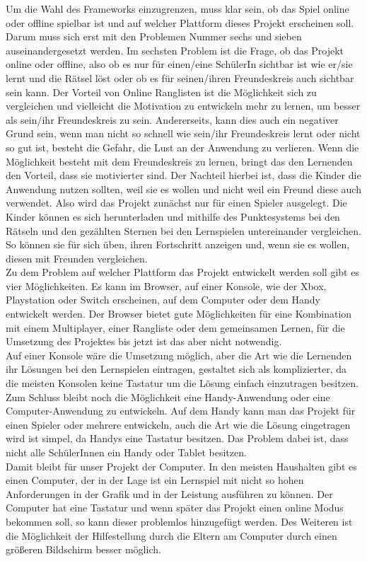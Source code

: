 Um die Wahl des Frameworks einzugrenzen, muss klar sein, ob das Spiel online oder offline spielbar ist und auf welcher Plattform dieses Projekt erscheinen soll.\\
Darum muss sich erst mit den Problemen Nummer sechs und sieben auseinandergesetzt werden.
Im sechsten Problem ist die Frage, ob das Projekt online oder offline, also ob es nur für einen/eine SchülerIn sichtbar ist wie er/sie lernt und die Rätsel löst oder ob es für seinen/ihren Freundeskreis auch sichtbar sein kann. Der Vorteil von Online Ranglisten ist die Möglichkeit sich zu vergleichen und vielleicht die Motivation zu entwickeln mehr zu lernen, um besser als sein/ihr Freundeskreis zu sein. Andererseits, kann dies auch ein negativer Grund sein, wenn man  nicht so schnell wie sein/ihr Freundeskreis lernt oder nicht so gut ist, besteht die Gefahr, die Lust an der Anwendung zu verlieren. Wenn die Möglichkeit besteht mit dem Freundeskreis zu lernen, bringt das den Lernenden den Vorteil, dass sie motivierter sind. Der Nachteil hierbei ist, dass die Kinder die Anwendung nutzen sollten, weil sie es wollen und nicht weil ein Freund diese auch verwendet. Also wird das Projekt zunächst nur für einen Spieler ausgelegt. Die Kinder können es sich herunterladen und mithilfe des Punktesystems bei den Rätseln und den gezählten Sternen bei den Lernspielen untereinander vergleichen. So können sie für sich üben, ihren Fortschritt anzeigen und, wenn sie es wollen, diesen mit Freunden vergleichen.\\
Zu dem Problem auf welcher Plattform das Projekt entwickelt werden soll gibt es vier Möglichkeiten. Es kann im Browser, auf einer Konsole, wie der Xbox, Playstation oder Switch erscheinen, auf dem Computer oder dem Handy entwickelt werden. Der Browser bietet gute Möglichkeiten für eine Kombination mit einem Multiplayer, einer Rangliste oder dem  gemeinsamen Lernen, für die Umsetzung des Projektes bis jetzt ist das aber nicht notwendig.\\
Auf einer Konsole wäre die Umsetzung möglich, aber die Art wie die Lernenden ihr Lösungen bei den Lernspielen eintragen, gestaltet sich als komplizierter, da die meisten Konsolen keine Tastatur um die Lösung einfach einzutragen besitzen. Zum Schluss bleibt noch die Möglichkeit eine Handy-Anwendung oder eine Computer-Anwendung zu entwickeln. Auf dem Handy kann man das Projekt für einen Spieler oder mehrere entwickeln, auch die Art wie die Lösung eingetragen wird ist simpel, da Handys eine Tastatur besitzen. Das Problem dabei ist, dass nicht alle SchülerInnen ein Handy oder Tablet besitzen.\\
Damit bleibt für unser Projekt der Computer. In den meisten Haushalten gibt es einen Computer, der in der Lage ist ein Lernspiel mit nicht so hohen Anforderungen in der Grafik und in der Leistung ausführen zu können. Der Computer hat eine Tastatur und wenn später das Projekt einen online Modus bekommen soll, so kann dieser problemlos hinzugefügt werden. Des Weiteren ist die Möglichkeit der Hilfestellung durch die Eltern am Computer durch einen größeren Bildschirm besser möglich.

